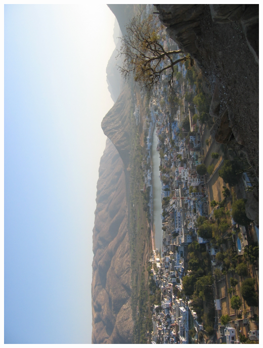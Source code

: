 %
\newpage\vspace*{-5cm}
\thispagestyle{empty}
\hspace*{-3.5cm}
\includegraphics[width=15.9cm]{articles/pagesCentrales/indePushkar.jpg}

